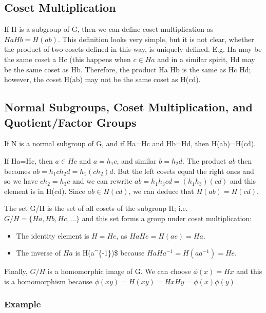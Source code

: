 \subsection{Coset Multiplication}\label{coset-multiplication}

If H is a subgroup of G, then we can define coset multiplication as
\(Ha Hb = H(ab)\). This definition looks very simple, but it is not
clear, whether the product of two cosets defined in this way, is
uniquely defined. E.g. Ha may be the same coset a Hc (this happens when
\(c \in Ha\) and in a similar spirit, Hd may be the same coset as Hb.
Therefore, the product Ha Hb is the same as Hc Hd; however, the coset
H(ab) may not be the same coset as H(cd).

\subsection{Normal Subgroups, Coset Multiplication, and Quotient/Factor
Groups}\label{normal-subgroups-coset-multiplication-and-quotientfactor-groups}

If N is a normal subgroup of G, and if Ha=Hc and Hb=Hd, then
H(ab)=H(cd).

If Ha=Hc, then \(a \in Hc\) and \(a=h_1c\), and similar \(b=h_2d\). The
product \(ab\) then becomes \(ab = h_1 c h_2 d = h_1 (c h_2) d\). But
the left cosets equal the right ones and so we have \(c h_2 = h_3 c\)
and we can rewrite \(ab = h_1 h_3 c d = (h_1 h_3)(c d)\) and this
element is in H(cd). Since \(ab \in H(cd)\), we can deduce that
\(H(ab) = H(cd)\).

The set G/H is the set of all cosets of the subgroup H; i.e.
\(G/H=\{Ha, Hb, Hc, \ldots\}\) and this set forms a group under coset
multiplication:

\begin{itemize}
\item
  The identity element is \(H=He\), as \(Ha He = H(ae) = Ha\).
\item
  The inverse of \(Ha\) is H(a\^{}\{-1\})\$ because
  \(Ha Ha^{-1} = H(a a^{-1}) = He\).
\end{itemize}

Finally, \(G/H\) is a homomorphic image of G. We can choose
\(\phi(x) = Hx\) and this is a homomorphism because
\(\phi(xy) = H(xy) = Hx Hy = \phi(x) \phi(y)\).

\subsubsection{Example}\label{example-1}


